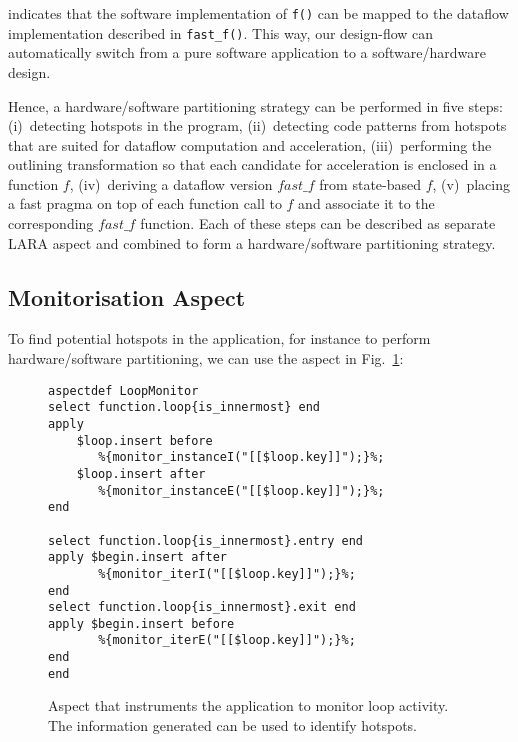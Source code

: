 \noindent indicates that the software implementation of \texttt{f()} can be
mapped to the dataflow implementation described in \texttt{fast\_f()}. This
way, our design-flow can automatically switch from a pure software
application to a software/hardware design.

Hence, a hardware/software partitioning strategy can be performed in five steps: (i)~detecting hotspots in the program, (ii)~detecting code patterns from hotspots that are suited for dataflow computation and acceleration,
(iii)~performing the outlining transformation so that each candidate
for acceleration is enclosed in a function $f$, (iv)~deriving a
dataflow version $fast\_f$ from state-based $f$, (v)~placing a fast pragma on top of each function call to $f$ and associate it to the corresponding $fast\_f$ function. Each of these steps can be described as separate LARA aspect and combined to form a hardware/software partitioning strategy.

\subsection{Monitorisation Aspect}
\label{sect:asp_mon}
To find potential hotspots in the application, for instance to perform hardware/software partitioning, we can use the aspect in Fig.~\ref{fig:hotspot}:

\lstset{style=lara}
\begin{figure}[!h]
\begin{lstlisting}
aspectdef LoopMonitor
select function.loop{is_innermost} end
apply
    $loop.insert before
       %{monitor_instanceI("[[$loop.key]]");}%;
    $loop.insert after
       %{monitor_instanceE("[[$loop.key]]");}%;
end

select function.loop{is_innermost}.entry end
apply $begin.insert after
       %{monitor_iterI("[[$loop.key]]");}%;
end
select function.loop{is_innermost}.exit end
apply $begin.insert before
       %{monitor_iterE("[[$loop.key]]");}%;
end
end
\end{lstlisting}
\caption{Aspect that instruments the application to monitor loop activity. The information generated can be used to identify hotspots.}
\label{fig:hotspot}
\end{figure}

